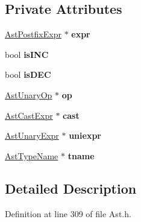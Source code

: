 \subsection*{Private Attributes}
\begin{DoxyCompactItemize}
\item 
\hypertarget{classAstUnaryExpr_aba63616a6671ffe16f3cff6fd2bfd303}{\hyperlink{classAstPostfixExpr}{Ast\-Postfix\-Expr} $\ast$ {\bfseries expr}}\label{classAstUnaryExpr_aba63616a6671ffe16f3cff6fd2bfd303}

\item 
\hypertarget{classAstUnaryExpr_a76418e6a58878a1da236456a7e232168}{bool {\bfseries is\-I\-N\-C}}\label{classAstUnaryExpr_a76418e6a58878a1da236456a7e232168}

\item 
\hypertarget{classAstUnaryExpr_af5b5ac5242011e11a12a6697812ec459}{bool {\bfseries is\-D\-E\-C}}\label{classAstUnaryExpr_af5b5ac5242011e11a12a6697812ec459}

\item 
\hypertarget{classAstUnaryExpr_ae83e3998a7815424cdd8d3a78be10566}{\hyperlink{classAstUnaryOp}{Ast\-Unary\-Op} $\ast$ {\bfseries op}}\label{classAstUnaryExpr_ae83e3998a7815424cdd8d3a78be10566}

\item 
\hypertarget{classAstUnaryExpr_a50ed86402a6819ebb0523f97b2d673d1}{\hyperlink{classAstCastExpr}{Ast\-Cast\-Expr} $\ast$ {\bfseries cast}}\label{classAstUnaryExpr_a50ed86402a6819ebb0523f97b2d673d1}

\item 
\hypertarget{classAstUnaryExpr_a9102108e850ae380a4ffed810d414c71}{\hyperlink{classAstUnaryExpr}{Ast\-Unary\-Expr} $\ast$ {\bfseries uniexpr}}\label{classAstUnaryExpr_a9102108e850ae380a4ffed810d414c71}

\item 
\hypertarget{classAstUnaryExpr_a1cb4b566967e6236f41a719a2abcccbd}{\hyperlink{classAstTypeName}{Ast\-Type\-Name} $\ast$ {\bfseries tname}}\label{classAstUnaryExpr_a1cb4b566967e6236f41a719a2abcccbd}

\end{DoxyCompactItemize}


\subsection{Detailed Description}


Definition at line 309 of file Ast.\-h.



